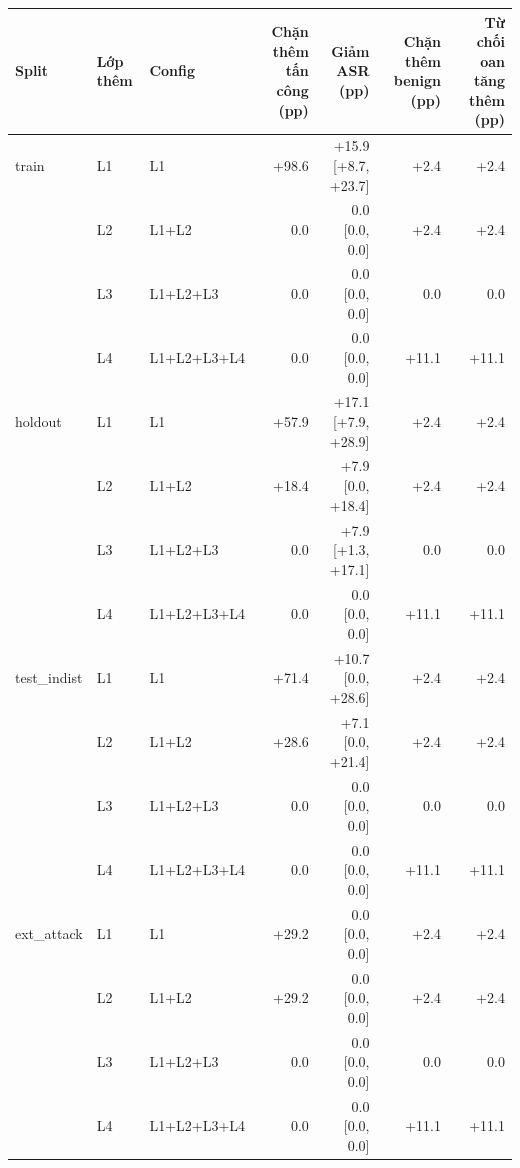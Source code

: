 \begin{tabular}{lllrrrr}
\toprule
Split & Lớp thêm & Config & Chặn thêm tấn công (pp) & Giảm ASR (pp) & Chặn thêm benign (pp) & Từ chối oan tăng thêm (pp) \\
\midrule
train & L1 & L1 & +98.6 & +15.9 [+8.7, +23.7] & +2.4 & +2.4 \\
 & L2 & L1+L2 & 0.0 & 0.0 [0.0, 0.0] & +2.4 & +2.4 \\
 & L3 & L1+L2+L3 & 0.0 & 0.0 [0.0, 0.0] & 0.0 & 0.0 \\
 & L4 & L1+L2+L3+L4 & 0.0 & 0.0 [0.0, 0.0] & +11.1 & +11.1 \\
\midrule
holdout & L1 & L1 & +57.9 & +17.1 [+7.9, +28.9] & +2.4 & +2.4 \\
 & L2 & L1+L2 & +18.4 & +7.9 [0.0, +18.4] & +2.4 & +2.4 \\
 & L3 & L1+L2+L3 & 0.0 & +7.9 [+1.3, +17.1] & 0.0 & 0.0 \\
 & L4 & L1+L2+L3+L4 & 0.0 & 0.0 [0.0, 0.0] & +11.1 & +11.1 \\
\midrule
test\_indist & L1 & L1 & +71.4 & +10.7 [0.0, +28.6] & +2.4 & +2.4 \\
 & L2 & L1+L2 & +28.6 & +7.1 [0.0, +21.4] & +2.4 & +2.4 \\
 & L3 & L1+L2+L3 & 0.0 & 0.0 [0.0, 0.0] & 0.0 & 0.0 \\
 & L4 & L1+L2+L3+L4 & 0.0 & 0.0 [0.0, 0.0] & +11.1 & +11.1 \\
\midrule
ext\_attack & L1 & L1 & +29.2 & 0.0 [0.0, 0.0] & +2.4 & +2.4 \\
 & L2 & L1+L2 & +29.2 & 0.0 [0.0, 0.0] & +2.4 & +2.4 \\
 & L3 & L1+L2+L3 & 0.0 & 0.0 [0.0, 0.0] & 0.0 & 0.0 \\
 & L4 & L1+L2+L3+L4 & 0.0 & 0.0 [0.0, 0.0] & +11.1 & +11.1 \\
\bottomrule
\end{tabular}

